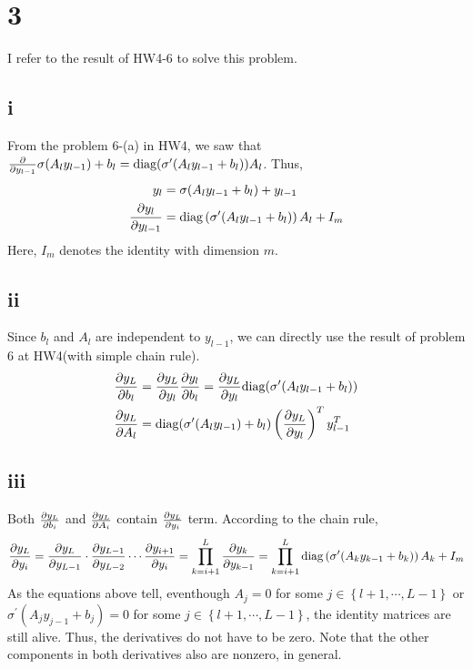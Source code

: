\documentclass[10pt]{article}
\begin{document}
\section*{3}
I refer to the result of HW4-6 to solve this problem. 
\subsection*{i}
From the problem 6-(a) in HW4, we saw that ${\partial\over \partial y_{l-1}} \sigma(A_ly_{l-1}) + b_l = \text{diag}(\sigma^\prime(A_ly_{l-1} + b_l))A_l$. Thus,
\begin{align*}
    y_l &= \sigma(A_ly_{l-1} + b_l) + y_{l-1} \\
    {\partial y_l \over \partial y_{l-1}} &= \text{diag}\left(\sigma^\prime(A_ly_{l-1} + b_l)\right)A_l + I_m
\end{align*}
Here, $I_m$ denotes the identity with dimension $m$.
\subsection*{ii}
Since $b_l$ and $A_l$ are independent to $y_{l-1}$, we can directly use the result of problem 6 at HW4(with simple chain rule).
\begin{align*}
    {\partial y_L\over \partial b_l} &= {\partial y_L \over \partial y_l} {\partial y_l \over \partial b_l} = {\partial y_L \over \partial y_l} \text{diag}(\sigma^\prime(A_ly_{l-1} + b_l))\\
    {\partial y_L \over \partial A_l} &= \text{diag}(\sigma^\prime(A_ly_{l-1})+ b_l)\left({\partial y_L \over \partial y_l}\right)^T y_{l-1}^T
\end{align*}

\subsection*{iii}
Both ${\partial y_L\over \partial b_i}$ and ${\partial y_L \over \partial A_i}$ contain ${\partial y_L \over \partial y_i}$ term. According to the chain rule, 
\begin{align*}
    {\partial y_L\over \partial y_i} = {\partial y_L \over \partial y_{L-1}} \cdot {\partial y_{L-1} \over \partial y_{L-2}}\cdots {\partial y_{i+1} \over \partial y_{i}} = \prod_{k = i+1}^L {\partial y_k \over \partial y_{k-1}} = \prod_{k = i+1}^L \text{diag}\left( \sigma^\prime(A_ky_{k-1} + b_k) \right)A_k + I_m
\end{align*}
As the equations above tell, eventhough $A_j = 0 $ for some $j\in \left\{l+1, \cdots, L-1\right\}$ or $\sigma^\prime(A_jy_{j-1} + b_j) = 0$ for some $j \in \left\{l+1,\cdots, L-1\right\}$, the identity matrices are still alive. Thus, the derivatives do not have to be zero.
Note that the other components in both derivatives also are nonzero, in general.
\end{document}
